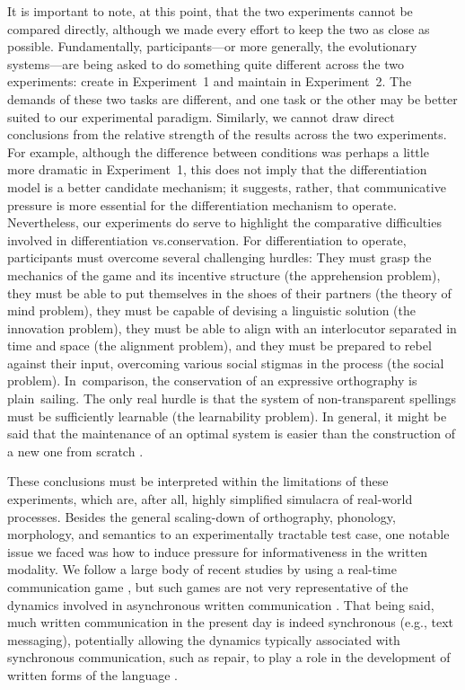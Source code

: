 \documentclass[doc,biblatex]{apa7}
\begin{document}
It is important to note, at this point, that the two experiments cannot be compared directly, although we made every effort to keep the two as close as possible. Fundamentally, participants---or more generally, the evolutionary systems---are being asked to do something quite different across the two experiments: create in Experiment~1 and maintain in Experiment~2. The demands of these two tasks are different, and one task or the other may be better suited to our experimental paradigm. Similarly, we cannot draw direct conclusions from the relative strength of the results across the two experiments. For example, although the difference between conditions was perhaps a little more dramatic in Experiment~1, this does not imply that the differentiation model is a better candidate mechanism; it suggests, rather, that communicative pressure is more essential for the differentiation mechanism to operate. Nevertheless, our experiments do serve to highlight the comparative difficulties involved in differentiation vs.\@ conservation. For differentiation to operate, participants must overcome several challenging hurdles: They must grasp the mechanics of the game and its incentive structure (the apprehension problem), they must be able to put themselves in the shoes of their partners (the theory of mind problem), they must be capable of devising a linguistic solution (the innovation problem), they must be able to align with an interlocutor separated in time and space (the alignment problem), and they must be prepared to rebel against their input, overcoming various social stigmas in the process (the social problem). In~comparison, the conservation of an expressive orthography is plain~sailing. The only real hurdle is that the system of non-transparent spellings must be sufficiently learnable (the learnability problem). In general, it might be said that the maintenance of an optimal system is easier than the construction of a new one from scratch \parencite[see also][]{Smith:2002}.

These conclusions must be interpreted within the limitations of these experiments, which are, after all, highly simplified simulacra of real-world processes. Besides the general scaling-down of orthography, phonology, morphology, and semantics to an experimentally tractable test case, one notable issue we faced was how to induce pressure for informativeness in the written modality. We follow a large body of recent studies by using a real-time communication game \parencite[e.g.,][]{Carr:2017, Kanwal:2017, Kirby:2015, Raviv:2018, Saldana:2019, Silvey:2019, Winters:2015}, but such games are not very representative of the dynamics involved in asynchronous written communication \parencite[although see][for some approaches]{Winters:2019}. That being said, much written communication in the present day is indeed synchronous (e.g., text messaging), potentially allowing the dynamics typically associated with synchronous communication, such as repair, to play a role in the development of written forms of the language \parencite{Lupyan:2016}.
\end{document}
